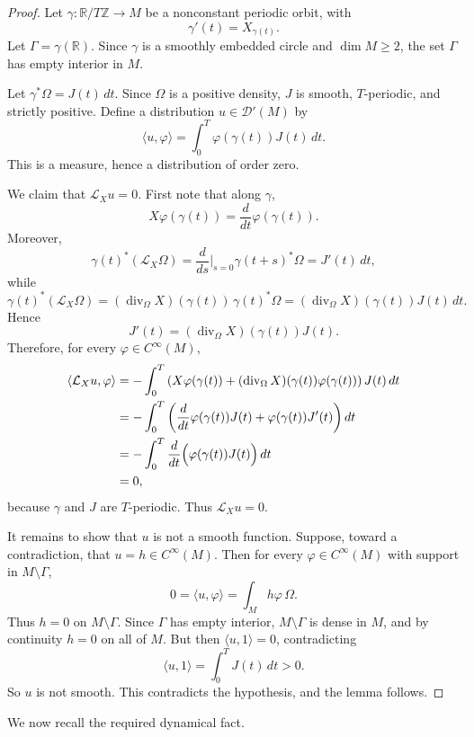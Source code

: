 \documentclass[11pt]{article}
\theoremstyle{remark}
\begin{document}
\begin{proof}
Let \(\gamma:\mathbb R/T\mathbb Z\to M\) be a nonconstant periodic orbit, with
\[
\gamma'(t)=X_{\gamma(t)}.
\]
Let \(\Gamma=\gamma(\mathbb R)\). Since \(\gamma\) is a smoothly embedded circle and \(\dim M\ge2\), the set \(\Gamma\) has empty interior in \(M\).

Let \(\gamma^*\Omega=J(t)\,dt\). Since \(\Omega\) is a positive density, \(J\) is smooth, \(T\)-periodic, and strictly positive. Define a distribution \(u\in\mathcal{D}'(M)\) by
\[
\langle u,\varphi\rangle
=
\int_0^T \varphi(\gamma(t))J(t)\,dt.
\]
This is a measure, hence a distribution of order zero.

We claim that \(\mathcal{L}_X u=0\). First note that along \(\gamma\),
\[
X\varphi(\gamma(t))=\frac{d}{dt}\varphi(\gamma(t)).
\]
Moreover,
\[
\gamma(t)^*(\mathcal{L}_X\Omega)
=
\frac{d}{ds}\bigg|_{s=0}\gamma(t+s)^*\Omega
=
J'(t)\,dt,
\]
while
\[
\gamma(t)^*(\mathcal{L}_X\Omega)
=
(\operatorname{div}_\Omega X)(\gamma(t))\,\gamma(t)^*\Omega
=
(\operatorname{div}_\Omega X)(\gamma(t))J(t)\,dt.
\]
Hence
\[
J'(t)=(\operatorname{div}_\Omega X)(\gamma(t))J(t).
\]
Therefore, for every \(\varphi\in C^\infty(M)\),
\[
\begin{aligned}
\langle \mathcal{L}_X u,\varphi\rangle
&=
-\int_0^T
\left(
X\varphi(\gamma(t))
+
(\operatorname{div}_\Omega X)(\gamma(t))\varphi(\gamma(t))
\right)J(t)\,dt\\
&=
-\int_0^T
\left(
\frac{d}{dt}\varphi(\gamma(t))J(t)
+
\varphi(\gamma(t))J'(t)
\right)dt\\
&=
-\int_0^T
\frac{d}{dt}\Bigl(\varphi(\gamma(t))J(t)\Bigr)\,dt\\
&=
0,
\end{aligned}
\]
because \(\gamma\) and \(J\) are \(T\)-periodic. Thus \(\mathcal{L}_X u=0\).

It remains to show that \(u\) is not a smooth function. Suppose, toward a contradiction, that \(u=h\in C^\infty(M)\). Then for every \(\varphi\in C^\infty(M)\) with support in \(M\setminus\Gamma\),
\[
0=\langle u,\varphi\rangle=\int_M h\varphi\,\Omega.
\]
Thus \(h=0\) on \(M\setminus\Gamma\). Since \(\Gamma\) has empty interior, \(M\setminus\Gamma\) is dense in \(M\), and by continuity \(h=0\) on all of \(M\). But then \(\langle u,1\rangle=0\), contradicting
\[
\langle u,1\rangle=\int_0^T J(t)\,dt>0.
\]
So \(u\) is not smooth. This contradicts the hypothesis, and the lemma follows.
\end{proof}

We now recall the required dynamical fact.
\end{document}
